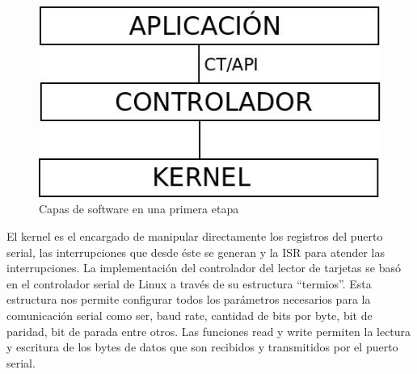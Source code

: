 \begin{figure}[H]
\centering
  \begin{center}
  \includegraphics[scale=.4]{Imagenes/SW_sc2.jpg} 
  \end{center}
  \caption{Capas de software en una primera etapa}\label{Fig:capas0} 
\end{figure}

\bigskip
{}

\bigskip
{}
El kernel es el encargado de manipular directamente los registros del puerto serial, las interrupciones que desde éste se generan y la ISR para atender las interrupciones.
La implementación del controlador del lector de tarjetas se basó en el controlador serial de Linux a través de su estructura “termios”. Esta estructura nos permite configurar todos los parámetros necesarios para la comunicación serial como ser, baud rate, cantidad de bits por byte, bit de paridad, bit de parada entre otros. Las funciones read y write permiten la lectura y escritura de los bytes de datos que son recibidos y transmitidos por el puerto serial.

